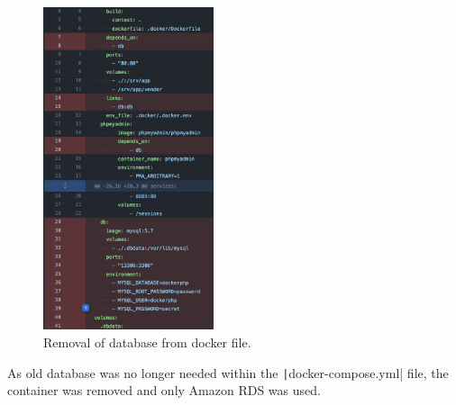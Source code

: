\begin{figure}[!htbp]
    \centering
    \includegraphics[width=50mm]{resources/rds/docker}
    \caption{Removal of database from docker file.}
    \label{fig:rds-rm-docker-compose}
\end{figure}

As old database was no longer needed within the \texttt|docker-compose.yml| file, the container was removed and
only Amazon RDS was used.
